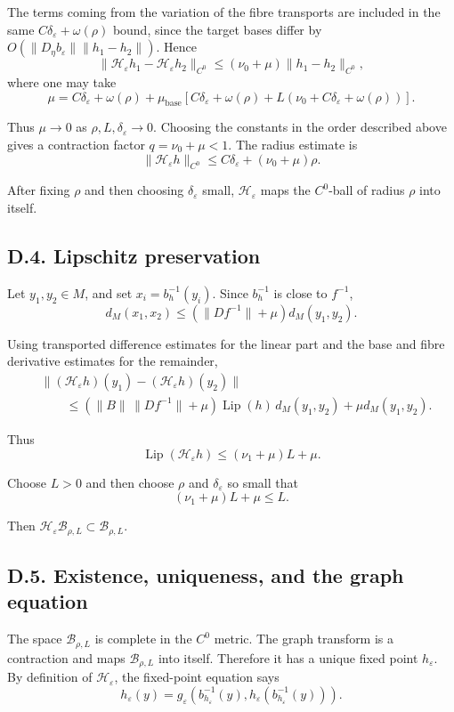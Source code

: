 \documentclass[12pt,a4paper]{article}
\theoremstyle{plain}
\numberwithin{equation}{section}
\numberwithin{theorem}{section}
\begin{document}
The terms coming from the variation of the fibre transports are included in the same $C\delta_\varepsilon+\omega(\rho)$ bound, since the target bases differ by $O(\|D_\eta b_\varepsilon\|\|h_1-h_2\|)$. Hence
\[
\|\mathcal H_\varepsilon h_1-
\mathcal H_\varepsilon h_2\|_{C^0}
\le
(\nu_0+
\mu)
\|h_1-h_2\|_{C^0},
\]
where one may take
\[
\mu
=
C\delta_\varepsilon+\omega(\rho)
+
\mu_{\mathrm{base}}
\left[
C\delta_\varepsilon+\omega(\rho)
+L(\nu_0+C\delta_\varepsilon+\omega(\rho))
\right].
\]

Thus $\mu\to0$ as $\rho,L,\delta_\varepsilon\to0$. Choosing the constants in the order described above gives a contraction factor $q=\nu_0+\mu<1$. The radius estimate is
\[
\|\mathcal H_\varepsilon h\|_{C^0}
\le
C\delta_\varepsilon+(\nu_0+\mu)\rho.
\]

After fixing $\rho$ and then choosing $\delta_\varepsilon$ small, $\mathcal H_\varepsilon$ maps the $C^0$-ball of radius $\rho$ into itself.

\subsection{D.4. Lipschitz preservation}

Let $y_1,y_2\in M$, and set $x_i=b_h^{-1}(y_i)$. Since $b_h^{-1}$ is close to $f^{-1}$,
\[
d_M(x_1,x_2)
\le
(\|Df^{-1}\|+
\mu)d_M(y_1,y_2).
\]

Using transported difference estimates for the linear part and the base and fibre derivative estimates for the remainder,
\[
\begin{aligned}
&\|(\mathcal H_\varepsilon h)(y_1)-(\mathcal H_\varepsilon h)(y_2)\| \\
&\qquad\le
(\|B\|\,\|Df^{-1}\|+
\mu)
\operatorname{Lip}(h)
\,d_M(y_1,y_2)
+
\mu d_M(y_1,y_2).
\end{aligned}
\]

Thus
\[
\operatorname{Lip}(\mathcal H_\varepsilon h)
\le
(\nu_1+
\mu)L+
\mu.
\]

Choose $L>0$ and then choose $\rho$ and $\delta_\varepsilon$ so small that
\[
(\nu_1+
\mu)L+
\mu
\le L.
\]

Then $\mathcal H_\varepsilon\mathcal B_{\rho,L}\subset\mathcal B_{\rho,L}$.

\subsection{D.5. Existence, uniqueness, and the graph equation}

The space $\mathcal B_{\rho,L}$ is complete in the $C^0$ metric. The graph transform is a contraction and maps $\mathcal B_{\rho,L}$ into itself. Therefore it has a unique fixed point $h_\varepsilon$. By definition of $\mathcal H_\varepsilon$, the fixed-point equation says
\[
h_\varepsilon(y)
=
g_\varepsilon(b_{h_\varepsilon}^{-1}(y),
h_\varepsilon(b_{h_\varepsilon}^{-1}(y))).
\]
\end{document}
